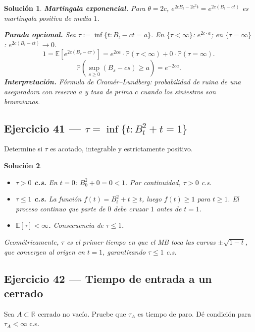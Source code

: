 \documentclass[12pt,letterpaper]{article}
\theoremstyle{ejercicio}
\theoremstyle{solucion}
\newtheorem*{solucion}{Solución}
\newcommand{\E}{\mathbb{E}}
\newcommand{\R}{\mathbb{R}}
\renewcommand{\P}{\mathbb{P}}
\begin{document}
\begin{solucion}
\textbf{Martingala exponencial.} Para $\theta=2c$, $e^{2cB_t-2c^2t}=e^{2c(B_t-ct)}$
es martingala positiva de media $1$.

\textbf{Parada opcional.} Sea $\tau:=\inf\{t:B_t-ct=a\}$.
En $\{\tau<\infty\}$: $e^{2c\cdot a}$; en $\{\tau=\infty\}$: $e^{2c(B_t-ct)}\to 0$.
\[
  1=\E[e^{2c(B_\tau-c\tau)}]=e^{2ca}\cdot\P(\tau<\infty)+0\cdot\P(\tau=\infty).
\]
\[
  \boxed{\P\!\left(\sup_{s\ge 0}(B_s-cs)\ge a\right)=e^{-2ca}.}
\]
\textbf{Interpretación.} Fórmula de Cramér–Lundberg: probabilidad de ruina de una aseguradora
con reserva $a$ y tasa de prima $c$ cuando los siniestros son brownianos.
\end{solucion}

\subsection*{Ejercicio 41 — $\tau=\inf\{t:B_t^2+t=1\}$}

\begin{recuadro}
Determine si $\tau$ es acotado, integrable y estrictamente positivo.
\end{recuadro}

\begin{solucion}
\begin{itemize}[leftmargin=*]
\item \textbf{$\tau>0$ c.s.} En $t=0$: $B_0^2+0=0<1$. Por continuidad, $\tau>0$ c.s.
\item \textbf{$\tau\le 1$ c.s.} La función $f(t)=B_t^2+t\ge t$, luego $f(t)\ge 1$ para $t\ge 1$.
  El proceso continuo que parte de $0$ debe cruzar $1$ antes de $t=1$.
\item \textbf{$\E[\tau]<\infty$.} Consecuencia de $\tau\le 1$.
\end{itemize}
Geométricamente, $\tau$ es el primer tiempo en que el MB toca las curvas $\pm\sqrt{1-t}$,
que convergen al origen en $t=1$, garantizando $\tau\le 1$ c.s.
\end{solucion}

\subsection*{Ejercicio 42 — Tiempo de entrada a un cerrado}

\begin{recuadro}
Sea $A\subset\R$ cerrado no vacío. Pruebe que $\tau_A$ es tiempo de paro.
Dé condición para $\tau_A<\infty$ c.s.
\end{recuadro}
\end{document}
